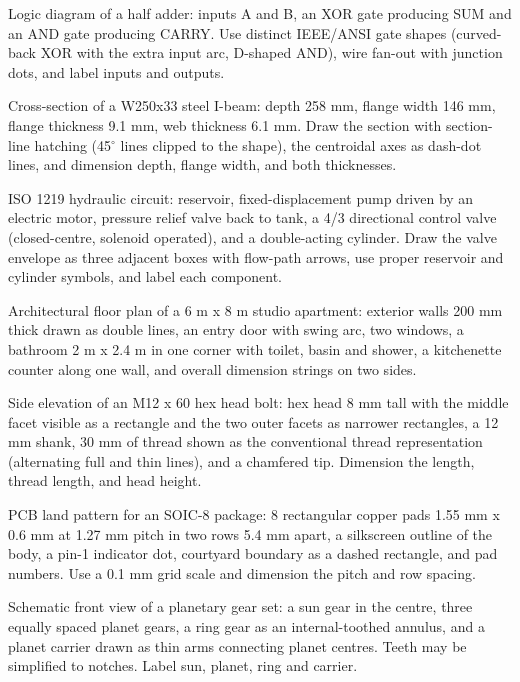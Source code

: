\documentclass[11pt,a4paper]{article}
\begin{document}
\begin{description}[style=nextline,leftmargin=1em]
\item[\texttt{half\_adder\_logic}] Logic diagram of a half adder: inputs A and B, an XOR gate producing SUM and an AND gate producing CARRY. Use distinct IEEE/ANSI gate shapes (curved-back XOR with the extra input arc, D-shaped AND), wire fan-out with junction dots, and label inputs and outputs.
\item[\texttt{ibeam\_section}] Cross-section of a W250x33 steel I-beam: depth 258 mm, flange width 146 mm, flange thickness 9.1 mm, web thickness 6.1 mm. Draw the section with section-line hatching (45$^{\circ}$ lines clipped to the shape), the centroidal axes as dash-dot lines, and dimension depth, flange width, and both thicknesses.
\item[\texttt{hydraulic\_circuit}] ISO 1219 hydraulic circuit: reservoir, fixed-displacement pump driven by an electric motor, pressure relief valve back to tank, a 4/3 directional control valve (closed-centre, solenoid operated), and a double-acting cylinder. Draw the valve envelope as three adjacent boxes with flow-path arrows, use proper reservoir and cylinder symbols, and label each component.
\item[\texttt{floor\_plan\_studio}] Architectural floor plan of a 6 m x 8 m studio apartment: exterior walls 200 mm thick drawn as double lines, an entry door with swing arc, two windows, a bathroom 2 m x 2.4 m in one corner with toilet, basin and shower, a kitchenette counter along one wall, and overall dimension strings on two sides.
\item[\texttt{hex\_bolt\_side}] Side elevation of an M12 x 60 hex head bolt: hex head 8 mm tall with the middle facet visible as a rectangle and the two outer facets as narrower rectangles, a 12 mm shank, 30 mm of thread shown as the conventional thread representation (alternating full and thin lines), and a chamfered tip. Dimension the length, thread length, and head height.
\item[\texttt{pcb\_footprint\_soic8}] PCB land pattern for an SOIC-8 package: 8 rectangular copper pads 1.55 mm x 0.6 mm at 1.27 mm pitch in two rows 5.4 mm apart, a silkscreen outline of the body, a pin-1 indicator dot, courtyard boundary as a dashed rectangle, and pad numbers. Use a 0.1 mm grid scale and dimension the pitch and row spacing.
\item[\texttt{planetary\_gearset}] Schematic front view of a planetary gear set: a sun gear in the centre, three equally spaced planet gears, a ring gear as an internal-toothed annulus, and a planet carrier drawn as thin arms connecting planet centres. Teeth may be simplified to notches. Label sun, planet, ring and carrier.

\end{description}
\end{document}
